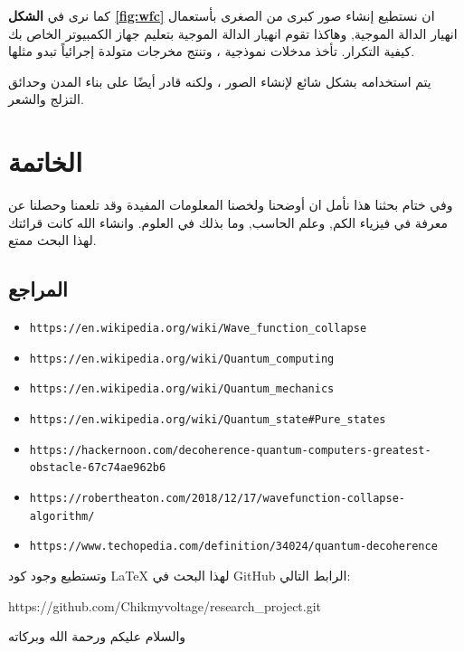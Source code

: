 \documentclass[a4paper,12pt,openright,twoside]{book}
\begin{document}
كما نرى في 
\textbf{الشكل \ref{fig:wfc}} 
ان نستطيع إنشاء صور كبرى من الصغرى بأستعمال انهيار الدالة الموجية, وهاكذا
تقوم انهيار الدالة الموجية بتعليم جهاز الكمبيوتر الخاص بك كيفية التكرار. تأخذ مدخلات نموذجية ، وتنتج مخرجات متولدة إجرائياً تبدو مثلها.

يتم استخدامه بشكل شائع لإنشاء الصور ، ولكنه قادر أيضًا على بناء المدن وحدائق التزلج والشعر.

\newpage

\chapter{الخاتمة}

\begin{center}
	
	وفي ختام بحثنا هذا نأمل ان أوضحنا ولخصنا المعلومات المفيدة وقد تلعمنا وحصلنا عن معرفة في فيزياء الكم, وعلم الحاسب, وما بذلك في العلوم. وانشاء الله كانت قرائتك  لهذا البحث ممتع.

\end{center}

\vspace*{0.3in}
\section{المراجع}

\vspace*{0.5in}
\begin{itemize}
		\scriptsize
	\item \verb|https://en.wikipedia.org/wiki/Wave_function_collapse|
	\item \verb|https://en.wikipedia.org/wiki/Quantum_computing|
	\item \verb|https://en.wikipedia.org/wiki/Quantum_mechanics|
	\item \verb|https://en.wikipedia.org/wiki/Quantum_state#Pure_states|
	\item \verb|https://hackernoon.com/decoherence-quantum-computers-greatest-obstacle-67c74ae962b6|
	\item \verb|https://robertheaton.com/2018/12/17/wavefunction-collapse-algorithm/|
	\item \verb|https://www.techopedia.com/definition/34024/quantum-decoherence|
\end{itemize}


\vspace*{0.2in}

\small
وتستطيع وجود كود\hspace{1pt}
\LaTeX \hspace{1pt}
 لهذا البحث في GitHub الرابط التالي:

 \begin{center}
	 \normalsize
	 \vspace*{0.3in}
 https://github.com/Chikmyvoltage/research\_project.git
 \end{center}

\vspace*{0.7in}

\begin{center}
	\LARGE
	والسلام عليكم ورحمة الله وبركاته
\end{center}
\end{document}
